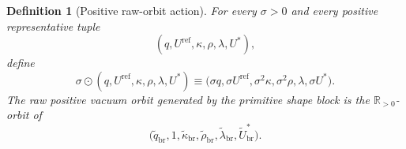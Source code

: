 \documentclass[11pt]{article}
\newcommand{\RespShapeReadout}{\widetilde q_{\mathrm{br}}}
\newcommand{\RespShapeCov}{\widetilde\kappa_{\mathrm{br}}}
\newcommand{\RespShapeRelax}{\widetilde\rho_{\mathrm{br}}}
\newcommand{\RespShapeWell}{\widetilde\lambda_{\mathrm{br}}}
\newcommand{\RespShapeEq}{\widetilde U_{\mathrm{br}}^{\ast}}
\newtheorem{definition}{Definition}
\begin{document}
\begin{definition}[Positive raw-orbit action]
\label{def:raworbitaction}
For every \(\sigma>0\) and every positive representative tuple
\[
(q,U^{\mathrm{ref}},\kappa,\rho,\lambda,U^\ast),
\]
define
\begin{equation}
\sigma\odot(q,U^{\mathrm{ref}},\kappa,\rho,\lambda,U^\ast)
\equiv
\bigl(\sigma q,\sigma U^{\mathrm{ref}},\sigma^2\kappa,\sigma^2\rho,\lambda,\sigma U^\ast\bigr).
\label{eq:orbitaction}
\end{equation}
The \emph{raw positive vacuum orbit generated by the primitive shape block} is the \(\mathbb R_{>0}\)-orbit of
\begin{equation}
\bigl(\RespShapeReadout,1,\RespShapeCov,\RespShapeRelax,\RespShapeWell,\RespShapeEq\bigr).
\label{eq:orbitbase}
\end{equation}
\end{definition}
\end{document}
